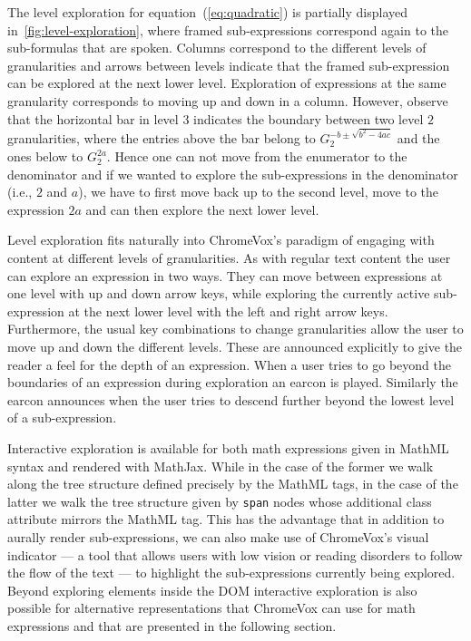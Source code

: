 \documentclass{sig-alternate}
\begin{document}
The level exploration for equation~(\ref{eq:quadratic}) is partially
displayed in~\ref{fig:level-exploration}, where framed sub-expressions correspond
again to the sub-formulas that are spoken. Columns correspond to the different
levels of granularities and arrows between levels indicate that the framed
sub-expression can be explored at the next lower level. Exploration of
expressions at the same granularity corresponds to moving up and down in a
column. However, observe that the horizontal bar in level $3$ indicates the
boundary between two level $2$ granularities, where the entries above the bar
belong to $G^{-b\pm\sqrt{b^2-4ac}}_2$ and the ones below to $G^{2a}_2$. Hence one
can not move from the enumerator to the denominator and if we wanted to explore
the sub-expressions in the denominator (i.e., $2$ and $a$), we have to first move
back up to the second level, move to the expression $2a$ and can then explore
the next lower level.

Level exploration fits naturally into ChromeVox's paradigm of engaging with
content at different levels of granularities. As with regular text content the
user can explore an expression in two ways. They can move between expressions at
one level with up and down arrow keys, while exploring the currently active
sub-expression at the next lower level with the left and right arrow
keys. Furthermore, the usual key combinations to change granularities allow the
user to move up and down the different levels. These are announced explicitly to
give the reader a feel for the depth of an expression.  When a user tries to go
beyond the boundaries of an expression during exploration an earcon is
played. Similarly the earcon announces when the user tries to descend further
beyond the lowest level of a sub-expression.

Interactive exploration is available for both math expressions given in MathML
syntax and rendered with MathJax. While in the case of the former we walk along
the tree structure defined precisely by the MathML tags, in the case of the
latter we walk the tree structure given by \texttt{span} nodes whose additional
class attribute mirrors the MathML tag. This has the advantage that in addition
to aurally render sub-expressions, we can also make use of ChromeVox's visual
indicator --- a tool that allows users with low vision or reading disorders to
follow the flow of the text --- to highlight the sub-expressions currently being
explored. Beyond exploring elements inside the DOM interactive exploration is
also possible for alternative representations that ChromeVox can use for math
expressions and that are presented in the following section.
\end{document}
